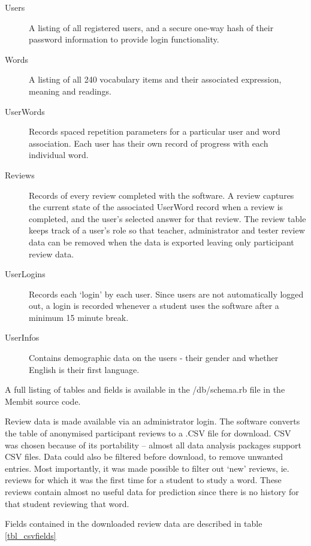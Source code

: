 \begin{description}
\item[Users] A listing of all registered users, and a secure one-way hash of their password information
to provide login functionality.
\item[Words] A listing of all 240 vocabulary items and their associated expression, meaning and readings.
\item[UserWords] Records spaced repetition parameters for a particular user and word association.
Each user has their own record of progress with each individual word.
\item[Reviews] Records of every review completed with the software. A review captures the current state of
the associated UserWord record when a review is completed, and the user's selected answer for that review.
The review table keeps track of a user's role so that teacher, administrator and tester review data
can be removed when the data is exported leaving only participant review data.
\item[UserLogins] Records each `login' by each user. Since users are not automatically logged out,
a login is recorded whenever a student uses the software after a minimum 15 minute break.
\item[UserInfos] Contains demographic data on the users - their gender and whether English is their first language.
\end{description}

A full listing of tables and fields is available in the /db/schema.rb file in the Membit source code.


Review data is made available via an administrator login. The software converts the
table of anonymised participant reviews to a .CSV file for download. CSV was chosen because of its portability --
almost all data analysis packages support CSV files. Data could also be filtered before download, 
to remove unwanted entries. Most importantly, it was made possible to filter out `new' reviews, ie.
reviews for which it was the first time for a student to study a word. These reviews contain almost
no useful data for prediction since there is no history for that student reviewing that word.

Fields contained in the downloaded review data are described in table \ref{tbl_csvfields}


